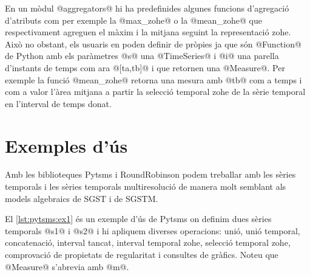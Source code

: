 En un mòdul @aggregators@ hi ha predefinides algunes funcions
d'agregació d'atributs com per exemple la @max_zohe@ o la
@mean_zohe@ que respectivament agreguen el màxim i la mitjana seguint
la representació \gls{zohe}.  Això no obstant, els usuaris en poden
definir de pròpies ja que són @Function@ de Python amb els paràmetres
@s@ una @TimeSeries@ i @i@ una parella d'instants de temps com ara
@[ta,tb]@ i que retornen una @Measure@. Per exemple la funció
@mean_zohe@ retorna una mesura amb @tb@ com a temps i com a valor
l'àrea mitjana a partir la selecció temporal \gls{zohe} de la sèrie
temporal en l'interval de temps donat.






\section{Exemples d'ús}


Amb les biblioteques Pytsms i RoundRobinson podem treballar amb les
sèries temporals i les sèries temporals multiresolució de manera molt
semblant als models algebraics de \gls{SGST} i de \gls{SGSTM}.




El \autoref{lst:pytsms:ex1} és un exemple d'ús de Pytsms on definim
dues sèries temporals @s1@ i @s2@ i hi apliquem diverses operacions:
unió, unió temporal, concatenació, interval tancat, interval temporal
\gls{zohe}, selecció temporal \gls{zohe}, comprovació de propietats de
regularitat i consultes de gràfics. Noteu que @Measure@ s'abrevia amb
@m@.

